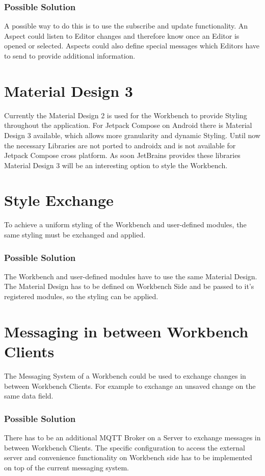 \subsubsection{Possible Solution}
A possible way to do this is to use the subscribe and update functionality. An Aspect could listen to Editor changes and therefore know once an Editor is opened or selected. Aspects could also define special messages which Editors have to send to provide additional information.

\section{Material Design 3}
Currently the Material Design 2 is used for the Workbench to provide Styling throughout the application. For Jetpack Compose on Android there is Material Design 3 available, which allows more granularity and dynamic Styling. Until now the necessary Libraries are not ported to androidx and is not available for Jetpack Compose cross platform.
As soon JetBrains provides these libraries Material Design 3 will be an interesting option to style the Workbench.

\section{Style Exchange}
To achieve a uniform styling of the Workbench and user-defined modules, the same styling must be exchanged and applied.

\subsubsection{Possible Solution}
The Workbench and user-defined modules have to use the same Material Design. The Material Design has to be defined on Workbench Side and be passed to it's registered modules, so the styling can be applied.


\section{Messaging in between Workbench Clients}
The Messaging System of a Workbench could be used to exchange changes in between Workbench Clients. For example to exchange an unsaved change on the same data field.

\subsubsection{Possible Solution}
There has to be an additional MQTT Broker on a Server to exchange messages in between Workbench Clients. The specific configuration to access the external server and convenience functionality on Workbench side has to be implemented on top of the current messaging system.


